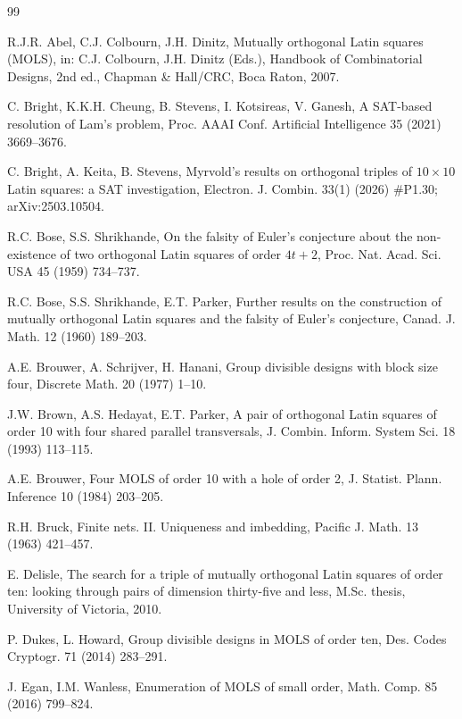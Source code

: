 \documentclass[11pt]{article}
\theoremstyle{remark}
\begin{document}
\begin{thebibliography}{99}

 R.J.R. Abel, C.J. Colbourn, J.H. Dinitz, Mutually orthogonal Latin squares
(MOLS), in: C.J. Colbourn, J.H. Dinitz (Eds.), Handbook of Combinatorial Designs, 2nd ed.,
Chapman \& Hall/CRC, Boca Raton, 2007.

 C. Bright, K.K.H. Cheung, B. Stevens, I. Kotsireas, V. Ganesh, A SAT-based
resolution of Lam's problem, Proc. AAAI Conf. Artificial Intelligence 35 (2021) 3669--3676.

 C. Bright, A. Keita, B. Stevens, Myrvold's results on orthogonal triples of
$10\times 10$ Latin squares: a SAT investigation, Electron. J. Combin. 33(1) (2026) \#P1.30;
arXiv:2503.10504.

 R.C. Bose, S.S. Shrikhande, On the falsity of Euler's conjecture about the
non-existence of two orthogonal Latin squares of order $4t+2$, Proc. Nat. Acad. Sci. USA 45
(1959) 734--737.

 R.C. Bose, S.S. Shrikhande, E.T. Parker, Further results on the
construction of mutually orthogonal Latin squares and the falsity of Euler's conjecture,
Canad. J. Math. 12 (1960) 189--203.

 A.E. Brouwer, A. Schrijver, H. Hanani, Group divisible designs with block
size four, Discrete Math. 20 (1977) 1--10.

 J.W. Brown, A.S. Hedayat, E.T. Parker, A pair of orthogonal Latin squares of
order 10 with four shared parallel transversals, J. Combin. Inform. System Sci. 18 (1993)
113--115.

 A.E. Brouwer, Four MOLS of order 10 with a hole of order 2, J. Statist.
Plann. Inference 10 (1984) 203--205.

 R.H. Bruck, Finite nets. II. Uniqueness and imbedding, Pacific J. Math. 13
(1963) 421--457.

 E. Delisle, The search for a triple of mutually orthogonal Latin squares of
order ten: looking through pairs of dimension thirty-five and less, M.Sc. thesis,
University of Victoria, 2010.

 P. Dukes, L. Howard, Group divisible designs in MOLS of order ten, Des.
Codes Cryptogr. 71 (2014) 283--291.

 J. Egan, I.M. Wanless, Enumeration of MOLS of small order, Math. Comp. 85
(2016) 799--824.


\end{thebibliography}
\end{document}
